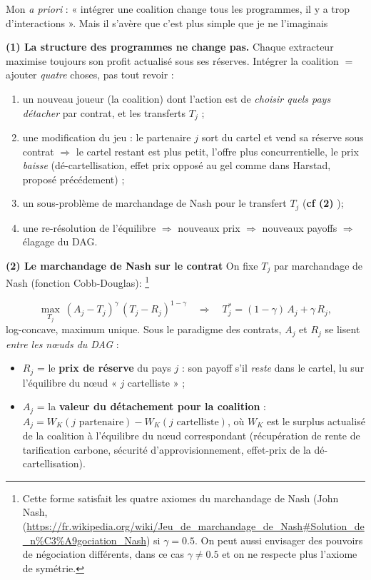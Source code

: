 \documentclass[11pt]{article}
\begin{document}
Mon \textit{a priori} : « intégrer une coalition change tous les programmes, il y a trop d'interactions ».
Mais il s'avère que c'est plus simple que je ne l'imaginais

\textbf{(1) La structure des programmes ne change pas.} Chaque extracteur maximise toujours son profit
actualisé sous ses réserves. Intégrer la coalition $=$ ajouter \emph{quatre} choses, pas tout revoir :
\begin{enumerate}\itemsep1pt
\item un nouveau joueur (la coalition) dont l'action est de \emph{choisir quels pays détacher} par contrat, et les transferts $T_j$ ;
\item une modification du jeu : le partenaire $j$ sort du cartel et vend sa réserve sous contrat $\Rightarrow$ le cartel restant est plus petit, l'offre plus concurrentielle, le prix \emph{baisse} (dé-cartellisation, effet prix opposé au gel comme dans Harstad, proposé précédement) ;
\item un sous-problème de marchandage de Nash pour le transfert $T_j$ (\textbf{cf (2) });
\item une re-résolution de l'équilibre $\Rightarrow$ nouveaux prix $\Rightarrow$ nouveaux payoffs $\Rightarrow$ élagage du DAG.
\end{enumerate}

\textbf{(2) Le marchandage de Nash sur le contrat} On fixe $T_j$ par marchandage de Nash (fonction Cobb-Douglas): \footnote{Cette forme satisfait les quatre axiomes du marchandage de Nash (John Nash, (\url{https://fr.wikipedia.org/wiki/Jeu_de_marchandage_de_Nash#Solution_de_n\%C3\%A9gociation_Nash}) si $\gamma = 0.5$. On peut aussi envisager des pouvoirs de négociation différents, dans ce cas $\gamma \neq 0.5$ et on ne respecte plus l'axiome de symétrie.} 

\[ 
\max_{T_j}\ (A_j-T_j)^{\gamma}\,(T_j-R_j)^{1-\gamma}
\quad\Longrightarrow\quad
T_j^{\ast}=(1-\gamma)\,A_j+\gamma\,R_j,
\]
log-concave, maximum unique. Sous le paradigme des contrats, $A_j$ et $R_j$ se lisent \emph{entre les n\oe uds du DAG} :
\begin{itemize}\itemsep1pt
\item $R_j$ = le \textbf{prix de réserve} du pays $j$ : son payoff s'il \emph{reste} dans le cartel, lu sur l'équilibre du n\oe ud « $j$ cartelliste » ;
\item $A_j$ = la \textbf{valeur du détachement pour la coalition} : $A_j = W_K(\text{$j$ partenaire}) - W_K(\text{$j$ cartelliste})$, où $W_K$ est le surplus actualisé de la coalition à l'équilibre du n\oe ud correspondant (récupération de rente de tarification carbone, sécurité d'approvisionnement, effet-prix de la dé-cartellisation).

\end{itemize}
\end{document}
